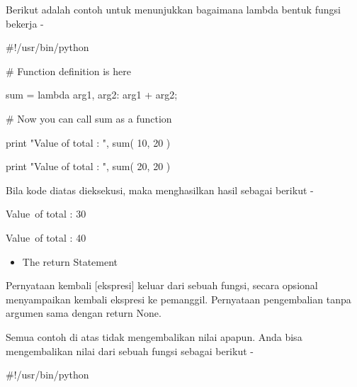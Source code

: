 \noindent 
Berikut adalah contoh untuk menunjukkan bagaimana lambda bentuk fungsi bekerja - \par
\noindent 
 \hspace*{0.5in}  $  \#  $!/usr/bin/python \par
\vspace{12pt}
\noindent 
 \hspace*{0.5in}  $  \#  $ Function definition is here \par
\noindent 
 \hspace*{0.5in} sum = lambda arg1, arg2: arg1 + arg2; \par
\vspace{12pt}
\noindent 
  \par
\vspace{12pt}
\noindent 
 \hspace*{0.5in}  $  \#  $ Now you can call sum as a function \par
\noindent 
 \hspace*{0.5in} print "Value of total : ", sum( 10, 20 ) \par
\noindent 
 \hspace*{0.5in} print "Value of total : ", sum( 20, 20 ) \par
\vspace{\baselineskip}
\noindent 
Bila kode diatas dieksekusi, maka menghasilkan hasil sebagai berikut - \par
\noindent 
 \hspace*{0.5in} Value~of total :  30 \par
\noindent 
 \hspace*{0.5in} Value~of total :  40 \par
\vspace{12pt}
\noindent 
\begin{itemize}
	\item The return Statement 
\end{itemize}
\noindent 
Pernyataan kembali [ekspresi] keluar dari sebuah fungsi, secara opsional menyampaikan kembali ekspresi ke pemanggil. Pernyataan pengembalian tanpa argumen sama dengan return None. \par
\vspace{\baselineskip}
\noindent 
Semua contoh di atas tidak mengembalikan nilai apapun. Anda bisa mengembalikan nilai dari sebuah fungsi sebagai berikut - \par
\vspace{\baselineskip}
\noindent 
 \hspace*{0.5in}  $  \#  $!/usr/bin/python \par
